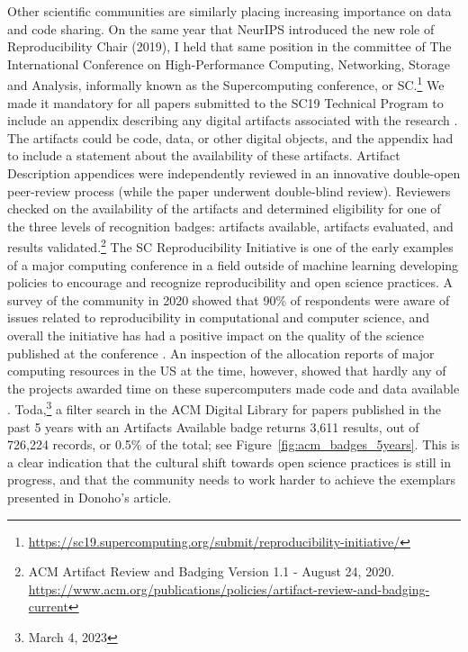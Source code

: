 \documentclass[]{hdsr}
\begin{document}
Other scientific communities are similarly placing increasing importance on data and code sharing. On the same year that NeurIPS introduced the new role of Reproducibility Chair (2019), I held that same position in the committee of The International Conference on High-Performance Computing, Networking, Storage and Analysis, informally known as the Supercomputing conference, or SC.\footnote{\url{https://sc19.supercomputing.org/submit/reproducibility-initiative/}} We made it mandatory for all papers submitted to the SC19 Technical Program to include an appendix describing any digital artifacts associated with the research \citep{barba2021trustworthy}. The artifacts could be code, data, or other digital objects, and the appendix had to include a statement about the availability of these artifacts. 
Artifact Description appendices were independently reviewed in an innovative double-open peer-review process (while the paper underwent double-blind review). Reviewers checked on the availability of the artifacts and determined eligibility for one of the three levels of recognition badges: artifacts available, artifacts evaluated, and results validated.\footnote{ACM Artifact Review and Badging Version 1.1 - August 24, 2020. \url{https://www.acm.org/publications/policies/artifact-review-and-badging-current}}
The SC Reproducibility Initiative is one of the early examples of a major computing conference in a field outside of machine learning developing policies to encourage and recognize reproducibility and open science practices. A survey of the community in 2020 showed that 90\% of respondents were aware of issues related to reproducibility in computational and computer science, and overall the initiative has had a positive impact on the quality of the science published at the conference \citep{plale2021reproducibility}.
An inspection of the allocation reports of major computing resources in the US at the time, however, showed that hardly any of the projects awarded time on these supercomputers made code and data available \citep{barba2021trustworthy}.
Toda,\footnote{March 4, 2023} a filter search in the ACM Digital Library for papers published in the past 5 years with an Artifacts Available badge returns 3,611 results, out of 726,224 records, or 0.5\% of the total; see Figure~\ref{fig:acm_badges_5years}.
This is a clear indication that the cultural shift towards open science practices is still in progress, and that the community needs to work harder to achieve the exemplars presented in Donoho's article.
\end{document}
